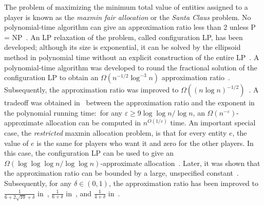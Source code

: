 \documentclass[11pt,a4paper]{article}
\renewcommand{\geq}{\geqslant}
\newcommand{\eps} {\varepsilon}
\begin{document}
The problem of maximizing the minimum total value of  entities assigned to a player is known as the \emph{maxmin fair allocation} or the \emph{Santa Claus} problem.  No polynomial-time algorithm can give an approximation ratio less than 2 unless P = NP~\cite{BD05}.  An LP relaxation of the problem, called configuration LP, has been developed; although its size is exponential,  it can be solved  by the  ellipsoid  method in polynomial time without an explicit construction of the entire LP~\cite{BS06}.  A polynomial-time algorithm was developed to round the fractional solution of the configuration LP to obtain an $\Omega(n^{-1/2}\log^{-3} n)$ approximation ratio~\cite{AS10}.  Subsequently, the approximation ratio was improved to $\Omega((n\log n)^{-1/2})$~\cite{SS}.  A tradeoff was obtained in~\cite{CCK09} between the approximation ratio and the exponent in the polynomial running time:~for any $\eps \geq 9\log\log n/\log n$, an $\Omega(n^{-\eps})$-approximate allocation can be computed in $n^{O(1/\eps)}$ time.  An important special case, the \emph{restricted} maxmin allocation problem, is that for every entity $e$, the value of $e$ is the same for players who want it and zero for the other players.  In this case, the configuration LP can  be used to give an~$\Omega(\log\log\log n/\log\log n)$-approximate allocation~\cite{BS06}. Later, it was shown that the  approximation ratio can be bounded by a large, unspecified constant~\cite{F,HSS}.  Subsequently, for any $\delta \in (0,1)$, the approximation ratio has been improved to $\frac{1}{6 + 2\sqrt{10} + \delta}$ in~\cite{AKS}, $\frac{1}{6+\delta}$ in~\cite{CM18,DRZ18}, and $\frac{1}{4+\delta}$ in~\cite{CM19,DRZ20}.
\end{document}
